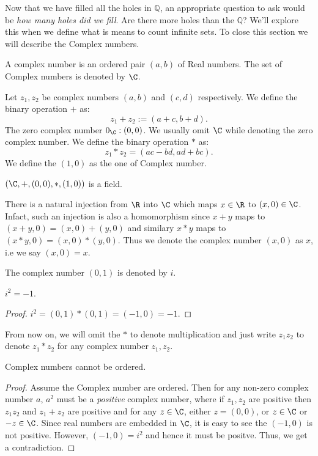Now that we have filled all the holes in $\mathbb{Q}$, an appropriate question to ask would be
\emph{how many holes did we fill}. Are there more holes than the $\mathbb{Q}$? We'll explore this
when we define what is means to count infinite sets. To close this section we will describe the Complex
numbers.
\begin{Definition}[name=Complex numbers]
    A complex number is an ordered pair $(a,b)$ of Real numbers. The set of Complex numbers is denoted by
    $\C$.
\end{Definition}
Let $z_1,z_2$ be complex numbers $(a,b)$ and $(c,d)$ respectively. We define the binary operation $+$
as:
\[z_1 + z_2 := (a+c,b+d).\]
The zero complex number $0_{\C} : (0,0)$. We usually omit $\C$ while denoting the zero complex number.
We define the binary operation $*$ as:
\[z_1 * z_2 = (ac - bd, ad + bc).\]
We define the $(1,0)$ as the one of Complex number.
\begin{Proposition}
    $\left(\C,+,(0,0),*,(1,0)\right)$ is a field.
\end{Proposition}
There is a natural injection from $\R$ into $\C$ which maps $x \in \R$ to $(x,0) \in \C$. Infact, such an
injection is also a homomorphism since $x + y$ maps to $(x+y,0) = (x,0) + (y,0)$ and similary $x*y$ maps to
$(x*y,0) = (x,0)*(y,0)$. Thus we denote the complex number  $(x,0)$ as $x$, i.e we say $(x,0) = x$.
\begin{Definition}
    The complex number $(0,1)$ is denoted by $i$.
\end{Definition}
\begin{Theorem}
    $i^2 = -1$.
\end{Theorem}
\begin{proof}
    $i^2 = (0,1)*(0,1) = (-1,0) = -1$.
\end{proof}
From now on, we will omit the $*$ to denote multiplication and just write $z_1z_2$ to denote $z_1 * z_2$ for
any complex number $z_1,z_2$.
\begin{Theorem}
    Complex numbers cannot be ordered. 
\end{Theorem}
\begin{proof}
    Assume the Complex number are ordered. Then for any non-zero complex number $a$, $a^2$ must be a
    \emph{positive} complex number, where if $z_1,z_2$ are positive then $z_1z_2$ and $z_1 + z_2$ are positive
    and for any $z\in \C$, either $z = (0,0)$, or $z \in \C$ or $-z \in \C$. Since real numbers are embedded
    in $\C$, it is easy to see the $(-1,0)$ is not positive. However, $(-1,0) = i^2$ and hence it must be
    positve. Thus, we get a contradiction.
\end{proof}

